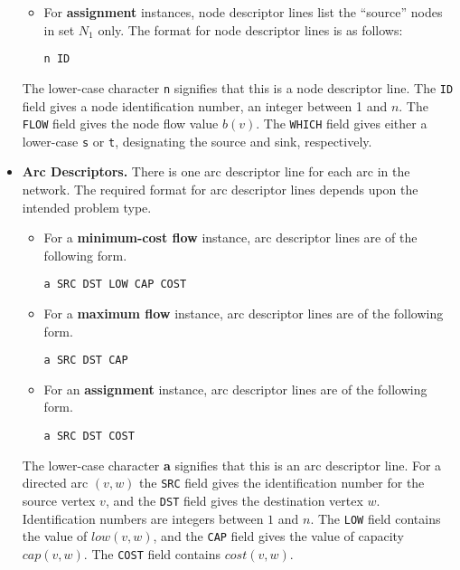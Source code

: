 \begin{itemize}
\begin{itemize}
\item For {\bf assignment} instances, node descriptor lines list 
the ``source'' nodes in set $N_1$ only.  The format for node
descriptor lines is as follows: 
\begin{verbatim}
n ID
\end{verbatim} 

\end{itemize} 
The lower-case character {\tt n} signifies that this is a node
descriptor line.  The {\tt ID} field gives a node identification
number, an integer between 1 and $n$.  The {\tt FLOW} field gives the
node flow value $b(v)$.  The {\tt WHICH} field gives either a
lower-case {\tt s} or {\tt t}, designating the source and sink,
respectively.

\item {\bf Arc Descriptors.} There is one arc descriptor line for each
arc in the network. The required format for arc descriptor lines depends 
upon the intended problem type.

\begin{itemize} 

\item For a {\bf minimum-cost flow} instance, arc 
descriptor lines are of the following form.
\begin{verbatim}
a SRC DST LOW CAP COST
\end{verbatim} 

\item For a {\bf maximum flow }instance, arc descriptor lines are
of the following form. 
\begin{verbatim}
a SRC DST CAP 
\end{verbatim} 

\item For an {\bf assignment} instance, arc descriptor lines are of
the following form. 
\begin{verbatim}
a SRC DST COST
\end{verbatim} 

\end{itemize} 
The lower-case character {\bf a} signifies that this is an arc descriptor 
line.  For a directed arc $(v,w)$ the {\tt SRC} field gives the identification 
number for the source vertex $v$, and the {\tt DST} field gives 
the destination vertex $w$.  Identification numbers are integers between 
$1$ and $n$.  The {\tt LOW} field contains the value 
of $low(v,w)$, and the {\tt CAP} field gives the value of
capacity $cap(v,w)$.  The {\tt COST} field contains $cost(v,w)$.
\end{itemize}  

